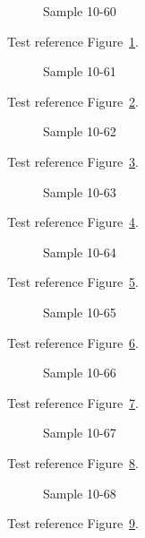 \begin{figure}[tbhp]
\caption{Sample 10-60}
\label{fig:sample-10-60}
\end{figure}

Test reference Figure~\ref{fig:sample-10-60}.

\begin{figure}[tbhp]
\caption{Sample 10-61}
\label{fig:sample-10-61}
\end{figure}

Test reference Figure~\ref{fig:sample-10-61}.

\begin{figure}[tbhp]
\caption{Sample 10-62}
\label{fig:sample-10-62}
\end{figure}

Test reference Figure~\ref{fig:sample-10-62}.

\begin{figure}[tbhp]
\caption{Sample 10-63}
\label{fig:sample-10-63}
\end{figure}

Test reference Figure~\ref{fig:sample-10-63}.

\begin{figure}[tbhp]
\caption{Sample 10-64}
\label{fig:sample-10-64}
\end{figure}

Test reference Figure~\ref{fig:sample-10-64}.

\begin{figure}[tbhp]
\caption{Sample 10-65}
\label{fig:sample-10-65}
\end{figure}

Test reference Figure~\ref{fig:sample-10-65}.

\begin{figure}[tbhp]
\caption{Sample 10-66}
\label{fig:sample-10-66}
\end{figure}

Test reference Figure~\ref{fig:sample-10-66}.

\begin{figure}[tbhp]
\caption{Sample 10-67}
\label{fig:sample-10-67}
\end{figure}

Test reference Figure~\ref{fig:sample-10-67}.

\begin{figure}[tbhp]
\caption{Sample 10-68}
\label{fig:sample-10-68}
\end{figure}

Test reference Figure~\ref{fig:sample-10-68}.

